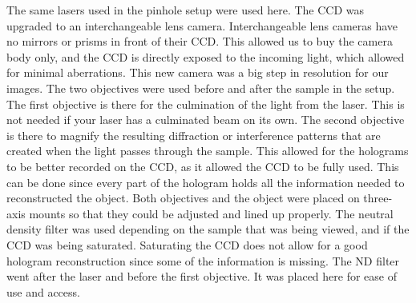 The same
lasers used in the pinhole setup were used here. The CCD was upgraded to an interchangeable
lens camera. Interchangeable lens cameras have no mirrors or prisms in front of
their CCD\@. This allowed us to buy the camera body only, and the CCD is directly
exposed to the incoming light, which allowed for minimal aberrations. This new
camera was a big step in resolution for our images. The two objectives were used
before and after the sample in the setup. The first objective is there for
the culmination of the light from the laser. This is not needed if your laser
has a culminated beam on its own. The second objective is there to
magnify the resulting diffraction or interference patterns that are created
when the light passes through the sample. This allowed for the holograms to be
better recorded on the CCD, as it allowed the CCD to be fully used. This can be
done since every part of the hologram holds all the information needed to
reconstructed the object. Both objectives and the object were placed on
three-axis mounts so that they could be adjusted and lined up properly.
The neutral
density filter was used depending on the sample that was being viewed, and if the CCD was being
saturated. Saturating the CCD does not allow for a good hologram reconstruction
since some of the information is missing. The ND filter went after the laser
and before the first objective. It was placed here for ease of use and access.


% 
